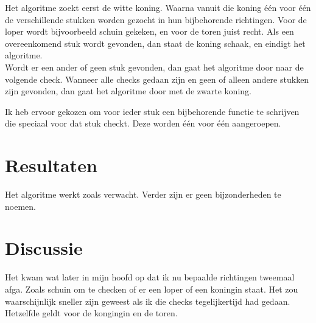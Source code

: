 \documentclass[a4paper,12pt]{article}
\begin{document}
Het algoritme zoekt eerst de witte koning. Waarna vanuit die koning \'e\'en
voor \'e\'en de verschillende stukken worden gezocht in hun bijbehorende
richtingen. Voor de loper wordt bijvoorbeeld schuin gekeken, en voor de toren
juist recht. Als een overeenkomend stuk wordt gevonden, dan staat de koning
schaak, en eindigt het algoritme.\\
Wordt er een ander of geen stuk gevonden, dan gaat het algoritme door naar
de volgende check. Wanneer alle checks gedaan zijn en geen of alleen andere
stukken zijn gevonden, dan gaat het algoritme door met de zwarte koning.

Ik heb ervoor gekozen om voor ieder stuk een bijbehorende functie te schrijven
die speciaal voor dat stuk checkt. Deze worden \'e\'en voor \'e\'en
aangeroepen.



\section{Resultaten}

Het algoritme werkt zoals verwacht. Verder zijn er geen bijzonderheden te
noemen.


\section{Discussie}

Het kwam wat later in mijn hoofd op dat ik nu bepaalde richtingen tweemaal
afga. Zoals schuin om te checken of er een loper of een koningin staat. Het zou
waarschijnlijk sneller zijn geweest als ik die checks tegelijkertijd had
gedaan. Hetzelfde geldt voor de kongingin en de toren.
\end{document}
